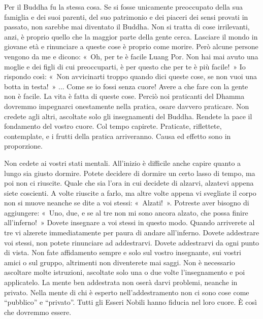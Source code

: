 Per il Buddha fu la stessa cosa. Se si fosse unicamente preoccupato
della sua famiglia e dei suoi parenti, del suo patrimonio e dei piaceri
dei sensi provati in passato, non sarebbe mai diventato il Buddha. Non
si tratta di cose irrilevanti, anzi, è proprio quello che la maggior
parte della gente cerca. Lasciare il mondo in giovane età e rinunciare a
queste cose è proprio come morire. Però alcune persone vengono da me e
dicono: «~Oh, per te è facile Luang Por. Non hai mai avuto una moglie e
dei figli di cui preoccuparti, è per questo che per te è più facile!~»
Io rispondo così: «~Non avvicinarti troppo quando dici queste cose, se
non vuoi una botta in testa!~» ... Come se io fossi senza cuore! Avere a
che fare con la gente non è facile. La vita è fatta di queste cose.
Perciò noi praticanti del Dhamma dovremmo impegnarci onestamente nella
pratica, osare davvero praticare. Non credete agli altri, ascoltate solo
gli insegnamenti del Buddha. Rendete la pace il fondamento del vostro
cuore. Col tempo capirete. Praticate, riflettete, contemplate, e i
frutti della pratica arriveranno. Causa ed effetto sono in proporzione.

Non cedete ai vostri stati mentali. All'inizio è difficile anche capire
quanto a lungo sia giusto dormire. Potete decidere di dormire un certo
lasso di tempo, ma poi non ci riuscite. Quale che sia l'ora in cui
decidete di alzarvi, alzatevi appena siete coscienti. A volte riuscite a
farlo, ma altre volte appena vi svegliate il corpo non si muove neanche
se dite a voi stessi: «~Alzati!~». Potreste aver bisogno di aggiungere:
«~Uno, due, e se al tre non mi sono ancora alzato, che possa finire
all'inferno!~» Dovete insegnare a voi stessi in questo modo. Quando
arriverete al tre vi alzerete immediatamente per paura di andare
all'inferno. Dovete addestrare voi stessi, non potete rinunciare ad
addestrarvi. Dovete addestrarvi da ogni punto di vista. Non fate
affidamento sempre e solo sul vostro insegnante, sui vostri amici o sul
gruppo, altrimenti non diventerete mai saggi. Non è necessario ascoltare
molte istruzioni, ascoltate solo una o due volte l'insegnamento e poi
applicatelo. La mente ben addestrata non oserà darvi problemi, neanche
in privato. Nella mente di chi è esperto nell'addestramento non ci sono
cose come ``pubblico'' e ``privato''. Tutti gli Esseri Nobili hanno
fiducia nel loro cuore. È così che dovremmo essere.

